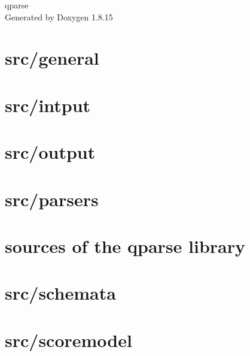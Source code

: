 \let\mypdfximage\pdfximage\def\pdfximage{\immediate\mypdfximage}\documentclass[twoside]{book}
\newcommand{\+}{\discretionary{\mbox{\scriptsize$\hookleftarrow$}}{}{}}
\newcommand{\clearemptydoublepage}{%
  \newpage{\pagestyle{empty}\cleardoublepage}%
}
\begin{document}
\hypersetup{pageanchor=false,
             bookmarksnumbered=true,
             pdfencoding=unicode
            }
\begin{titlepage}
\vspace*{7cm}
\begin{center}%
{\Large qparse }\\
\vspace*{1cm}
{\large Generated by Doxygen 1.8.15}\\
\end{center}
\end{titlepage}
\clearemptydoublepage
{}
\tableofcontents
\clearemptydoublepage
{}
\hypersetup{pageanchor=true}

\chapter{src/general}
\label{md_src_general_README}

\chapter{src/intput}
\label{md_src_input_README}

\chapter{src/output}
\label{md_src_output_README}

\chapter{src/parsers}
\label{md_src_parsers_README}

\chapter{sources of the qparse library}
\label{md_src_README}

\chapter{src/schemata}
\label{md_src_schemata_README}

\chapter{src/scoremodel}
\label{md_src_scoremodel_README}

\end{document}
